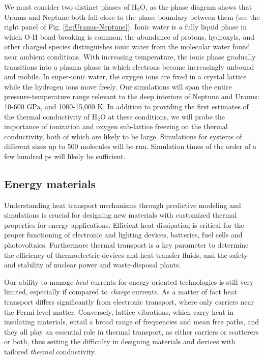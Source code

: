 We must consider two distinct phases of H$_2$O, as the phase diagram shows that Uranus and Neptune both fall close to the phase boundary between them\cite{Cavazzoni1999,redmeretal_11} (see the right panel of Fig. \ref{fig:Uranus-Neptune}). Ionic water is a fully liquid phase in which O-H bond breaking is common; the abundance of protons, hydroxyls, and other charged species distinguishes ionic water from the molecular water found near ambient conditions. With increasing temperature, the ionic phase gradually transitions into a plasma phase in which electrons become increasingly unbound and mobile. In super-ionic water, the oxygen ions are fixed in a crystal lattice while the hydrogen ions move freely. Our simulations will span the entire pressure-temperature range relevant to the deep interiors of Neptune and Uranus: 10-600 GPa, and 1000-15,000 K. In addition to providing the first estimates of the thermal conductivity of H$_2$O at these conditions, we will probe the importance of ionization and oxygen sub-lattice freezing on the thermal conductivity, both of which are likely to be large. Simulations for systems of different sizes up to 500 molecules will be run. Simulation times of the order of a few hundred ps will likely be sufficient.

\salta
\subsection{Energy materials}
Understanding heat transport mechanisms through predictive modeling and simulations is crucial for designing new materials with customized thermal properties for energy applications. Efficient heat dissipation is critical for the proper functioning of electronic and lighting devices, batteries, fuel cells and photovoltaics. Furthermore thermal transport is a key parameter to determine the efficiency of thermoelectric devices and heat transfer fluids, and the safety and stability of nuclear power and waste-disposal plants. 

Our ability to manage \emph{heat} currents for energy-oriented technologies is still very limited, especially if compared to \emph{charge} currents. 
As a matter of fact heat transport differs significantly from electronic transport, where only carriers near the Fermi level matter. Conversely, lattice vibrations, which carry heat in insulating materials, entail a broad range of frequencies and mean free paths, and they all play an essential role in thermal transport, as either carriers or scatterers or both, thus setting the difficulty in designing materials and devices with tailored \emph{thermal} conductivity.

